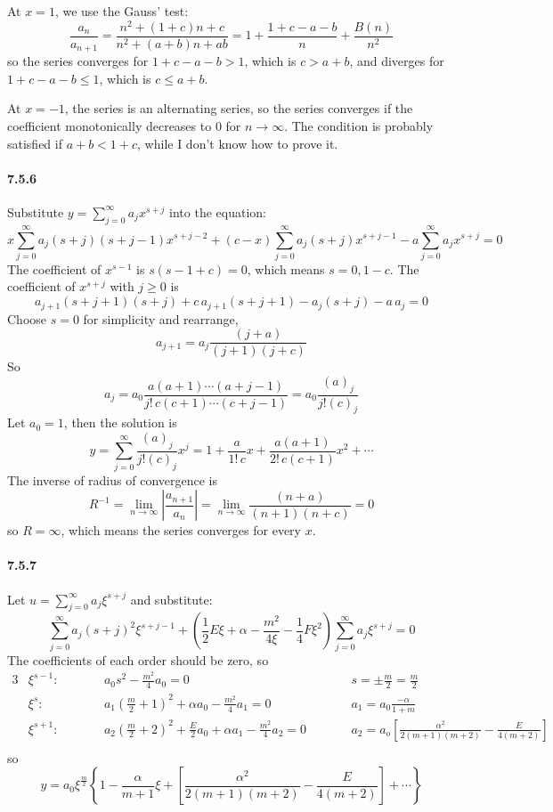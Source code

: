 \documentclass[a4paper]{article}
\begin{document}
At $x=1$, we use the Gauss' test:
\[
\frac{a_n}{a_{n+1}}=\frac{n^2+(1+c)n+c}{n^2+(a+b)n+ab}=1+\frac{1+c-a-b}{n}+\frac{B(n)}{n^2}
\]
so the series converges for $1+c-a-b>1$, which is $c>a+b$, and diverges for $1+c-a-b\leq1$, which is $c\leq a+b$.

At $x=-1$, the series is an alternating series, so the series converges if the coefficient monotonically decreases to $0$ for $n\to\infty$. The condition is probably satisfied if $a+b<1+c$, while I don't know how to prove it.

\paragraph{7.5.6}
Substitute $y=\sum_{j=0}^\infty a_jx^{s+j}$ into the equation:
\[
x\sum_{j=0}^\infty a_j(s+j)(s+j-1)x^{s+j-2}+(c-x)\sum_{j=0}^\infty a_j(s+j)x^{s+j-1}-a\sum_{j=0}^\infty a_jx^{s+j}=0
\]
The coefficient of $x^{s-1}$ is $s(s-1+c)=0$, which means $s=0,1-c$. The coefficient of $x^{s+j}$ with $j\geq0$ is 
\[
a_{j+1}(s+j+1)(s+j)+c\,a_{j+1}(s+j+1)-a_j(s+j)-a\,a_j=0
\]
Choose $s=0$ for simplicity and rearrange,
\[
a_{j+1}=a_j\frac{(j+a)}{(j+1)(j+c)}
\]
So
\[
a_j=a_0\frac{a(a+1)\cdots(a+j-1)}{j!\,c(c+1)\cdots(c+j-1)}=a_0\frac{(a)_j}{j!(c)_j}
\]
Let $a_0=1$, then the solution is 
\[
y=\sum_{j=0}^\infty\frac{(a)_j}{j!(c)_j}x^j=1+\frac{a}{1!\,c}x+\frac{a(a+1)}{2!\,c(c+1)}x^2+\cdots
\]
The inverse of radius of convergence is
\[
R^{-1}=\lim_{n\to\infty}\left|\frac{a_{n+1}}{a_n}\right|=\lim_{n\to\infty}\frac{(n+a)}{(n+1)(n+c)}=0 
\]
so $R=\infty$, which means the series converges for every $x$.

\paragraph{7.5.7}
Let $u=\sum_{j=0}^\infty a_j\xi^{s+j}$ and substitute:
\[
\sum_{j=0}^\infty a_j(s+j)^2\xi^{s+j-1}+(\frac{1}{2}E\xi+\alpha-\frac{m^2}{4\xi}-\frac{1}{4}F\xi^2)\sum_{j=0}^\infty a_j\xi^{s+j}=0
\]
The coefficients of each order should be zero, so
\begin{alignat*}{3}
    &\xi^{s-1}:\quad && a_0s^2-\frac{m^2}{4}a_0=0 && s=\pm\frac{m}{2}=\frac{m}{2}\\
    & \xi^s:\quad && a_1(\frac{m}{2}+1)^2+\alpha a_0-\frac{m^2}{4}a_1=0\quad && a_1=a_0\frac{-\alpha}{1+m}\\
    & \xi^{s+1}:\qquad && a_2(\frac{m}{2}+2)^2+\frac{E}{2}a_0+\alpha a_1-\frac{m^2}{4}a_2=0\qquad && a_2=a_o\left[\frac{\alpha^2}{2(m+1)(m+2)}-\frac{E}{4(m+2)} \right]\\
\end{alignat*}
so
\[
y=a_0\xi^{\frac{m}{2}}\left\{1-\frac{\alpha}{m+1}\xi+\left[\frac{\alpha^2}{2(m+1)(m+2)}-\frac{E}{4(m+2)} \right]+\cdots \right\}
\]
\end{document}
